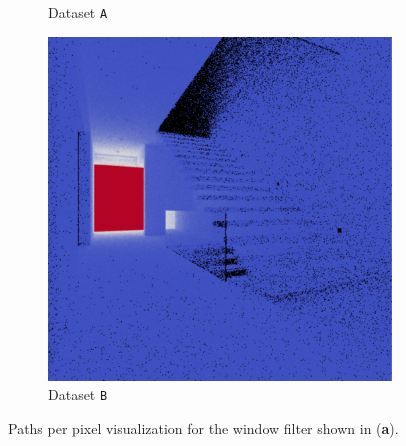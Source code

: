 \begin{figure}
\begin{subfigure}[t]{0.32\linewidth}
		\caption{Dataset \texttt{A}}
	\end{subfigure}
	\begin{subfigure}[t]{0.32\linewidth}
		\includegraphics[width=\textwidth]{chapters/chapter_results/wrong2ppp}
		\caption{Dataset \texttt{B}}
	\end{subfigure}

	\caption{Paths per pixel visualization for the window filter shown in (\textbf{a}).}
	\label{couple2ppp}
\end{figure}



